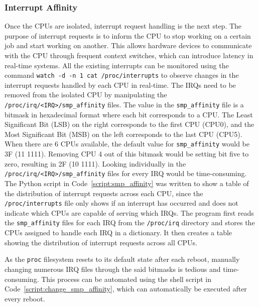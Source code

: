 \documentclass[MMR,Master,english]{style/twbook}
\begin{document}
\subsubsection{Interrupt Affinity}\label{subsubsec:irq_handling}
Once the CPUs are isolated, interrupt request handling is the next step. The purpose of interrupt requests is to inform the CPU to stop working on a certain job and start working on another. This allows hardware devices to communicate with the CPU through frequent context switches, which can introduce latency in real-time systems. All the existing interrupts can be monitored using the command \texttt{watch -d -n 1 cat /proc/interrupts} to observe changes in the interrupt requests handled by each CPU in real-time. The IRQs need to be removed from the isolated CPU by manipulating the \texttt{/proc/irq/<IRQ>/smp\_affinity} files. The value in the \texttt{smp\_affinity} file is a bitmask in hexadecimal format where each bit corresponds to a CPU. The Least Significant Bit (LSB) on the right corresponds to the first CPU (CPU0), and the Most Significant Bit (MSB) on the left corresponds to the last CPU (CPU5). When there are 6 CPUs available, the default value for \texttt{smp\_affinity} would be 3F (11 1111). Removing CPU 4 out of this bitmask would be setting bit five to zero, resulting in 2F (10 1111). Looking individually in the \texttt{/proc/irq/<IRQ>/smp\_affinity} files for every IRQ would be time-consuming. The Python script in Code~\ref{script:smp_affinity} was written to show a table of the distribution of interrupt requests across each CPU, since the \texttt{/proc/interrupts} file only shows if an interrupt has occurred and does not indicate which CPUs are capable of serving which IRQs. The program first reads the \texttt{smp\_affinity} files for each IRQ from the \texttt{/proc/irq} directory and stores the CPUs assigned to handle each IRQ in a dictionary. It then creates a table showing the distribution of interrupt requests across all CPUs.

\bigskip \noindent As the \texttt{proc} filesystem resets to its default state after each reboot, manually changing numerous IRQ files through the said bitmasks is tedious and time-consuming. This process can be automated using the shell script in Code~\ref{script:change_smp_affinity}, which can automatically be executed after every reboot.

\clearpage
\end{document}
